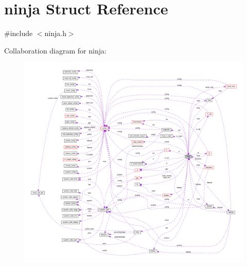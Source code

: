 \hypertarget{structninja}{\section{ninja Struct Reference}
\label{structninja}
}


{\ttfamily \#include $<$ninja.\+h$>$}



Collaboration diagram for ninja\+:
\nopagebreak
\begin{figure}[H]
\begin{center}
\leavevmode
\includegraphics[width=350pt]{structninja__coll__graph}
\end{center}
\end{figure}
